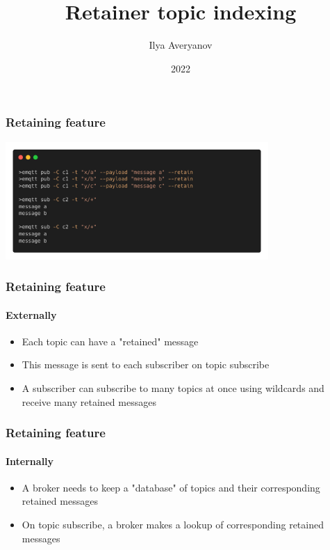 \documentclass{beamer}
\title{Retainer topic indexing}
\author{Ilya Averyanov}
\institute{EMQX}
\date{2022}
\begin{document}
\frame{\titlepage}

\begin{frame}
    \frametitle{Retaining feature}

    \begin{center}
        \includegraphics[width=10cm, keepaspectratio]{images/retain-demo.png}
    \end{center}
\end{frame}

\begin{frame}
    \frametitle{Retaining feature}
    \framesubtitle{Externally}

    \begin{itemize}
        \item Each topic can have a "retained" message
        \item This message is sent to each subscriber on topic subscribe
        \item A subscriber can subscribe to many topics at once using wildcards and receive many
        retained messages
    \end{itemize}
\end{frame}

\begin{frame}
    \frametitle{Retaining feature}
    \framesubtitle{Internally}

    \begin{itemize}
        \item A broker needs to keep a "database" of topics and their corresponding retained messages
        \item On topic subscribe, a broker makes a lookup of corresponding retained messages
    \end{itemize}
\end{frame}
\end{document}
